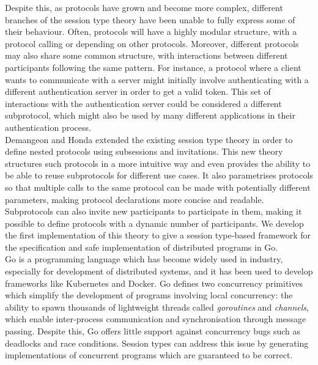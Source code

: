 \documentclass[12pt,twoside]{report}
\begin{document}
Despite this, as protocols have grown and become more complex, different branches of the session type theory have been unable to fully express some of their behaviour. Often, protocols will have a highly modular structure, with a protocol calling or depending on other protocols. Moreover, different protocols may also share some common structure, with interactions between different participants following the same pattern. For instance, a protocol where a client wants to communicate with a server might initially involve authenticating with a different authentication server in order to get a valid token. This set of interactions with the authentication server could be considered a different subprotocol, which might also be used by many different applications in their authentication process. \\

Demangeon and Honda \cite{nestedprotocols} extended the existing session type theory in order to define nested protocols using subsessions and invitations. This new theory structures such protocols in a more intuitive way and even provides the ability to be able to reuse subprotocols for different use cases. It also parametrises protocols so that multiple calls to the same protocol can be made with potentially different parameters, making protocol declarations more concise and readable. Subprotocols can also invite new participants to participate in them, making it possible to define protocols with a dynamic number of participants. We develop the first implementation of this theory to give a session type-based framework for the specification and safe implementation of distributed programs in Go.\\

Go is a programming language which has become widely used in industry\cite{gousers}, especially for development of distributed systems, and it has been used to develop frameworks like Kubernetes and Docker. Go defines two concurrency primitives which simplify the development of programs involving local concurrency\cite{godocs}: the ability to spawn thousands of lightweight threads called \textit{goroutines} and \textit{channels}, which enable inter-process communication and synchronisation through message passing. Despite this, Go offers little support against concurrency bugs such as deadlocks and race conditions. Session types can address this issue by generating implementations of concurrent programs which are guaranteed to be correct.\\
\end{document}
